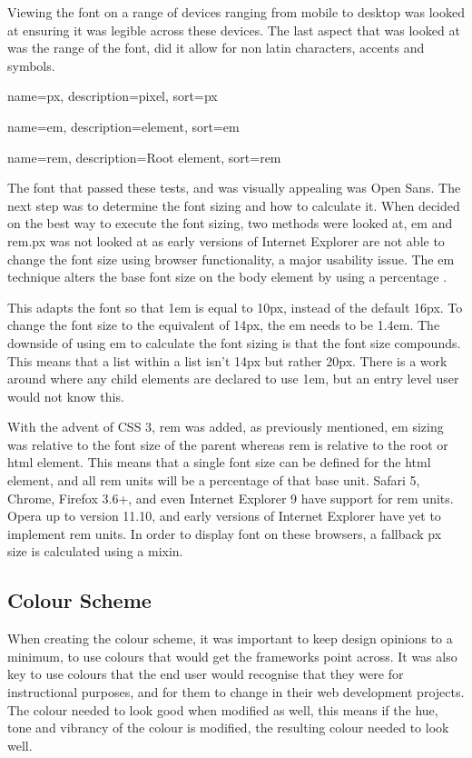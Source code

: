 Viewing the font on a range of devices ranging from mobile to desktop was looked at ensuring it was legible across these devices. The last aspect that was looked at was the range of the font, did it allow for non latin characters, accents and symbols\cite{WORD16}.

{
  name={px},
  description={pixel},
  sort=px
}
%

{
  name={em},
  description={element},
  sort=em
}

{
  name={rem},
  description={Root element},
  sort=rem
}

The font that passed these tests, and was visually appealing was Open Sans. The next step was to determine the font sizing and how to calculate it. When decided on the best way to execute the font sizing, two methods were looked at, \gls{em} and \gls{rem}.\gls{px} was not looked at as early versions of Internet Explorer are not able to change the font size using browser functionality, a major usability issue. The \gls{em} technique alters the base font size on the body element by using a percentage \cite{GUN16}.

This adapts the font so that 1em is equal to 10px, instead of the default 16px. To change the font size to the equivalent of 14px, the \gls{em} needs to be 1.4em. The downside of using em to calculate the font sizing is that the font size compounds. This means that a list within a list isn't 14px but rather 20px. There is a work around where any child elements are declared to use 1em, but an entry level user would not know this. 

With the advent of \gls{CSS} 3, \gls{rem} was added, as previously mentioned, \gls{em} sizing was relative to the font size of the parent whereas \gls{rem} is relative to the root or html element. This means that a single font size can be defined for the html element, and all \gls{rem} units will be a percentage of that base unit. Safari 5, Chrome, Firefox 3.6+, and even Internet Explorer 9 have support for \gls{rem} units. Opera up to version 11.10, and early versions of Internet Explorer have yet to implement \gls{rem} units. In order to display font on these browsers, a fallback \gls{px} size is calculated using a mixin. 

\subsection*{Colour Scheme}
When creating the colour scheme, it was important to keep design opinions to a minimum, to use colours that would get the frameworks point across. It was also key to use colours that the end user would recognise that they were for instructional purposes, and for them to change in their web development projects. The colour needed to look good when modified as well, this means if the hue, tone and vibrancy of the colour is modified, the resulting colour needed to look well. 

